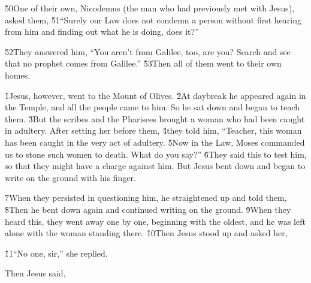 \v{50}One of their own, Nicodemus (the man who had previously met with Jesus), asked them, \v{51}``Surely our Law does not condemn a person without first hearing from him and finding out what he is doing, does it?''

\v{52}They answered him, ``You aren't from Galilee, too, are you? Search and see that no prophet comes from Galilee.'' \v{53}Then all of them went to their own homes.

\v{1}Jesus, however, went to the Mount of Olives. \v{2}At daybreak he appeared again in the Temple, and all the people came to him. So he sat down and began to teach them. \v{3}But the scribes and the Pharisees brought a woman who had been caught in adultery. After setting her before them, \v{4}they told him, ``Teacher, this woman has been caught in the very act of adultery. \v{5}Now in the Law, Moses commanded us to stone such women to death. What do you say?'' \v{6}They said this to test him, so that they might have a charge against him. But Jesus bent down and began to write on the ground with his finger.

\v{7}When they persisted in questioning him, he straightened up and told them,  \v{8}Then he bent down again and continued writing on the ground. \v{9}When they heard this, they went away one by one, beginning with the oldest, and he was left alone with the woman standing there. \v{10}Then Jesus stood up and asked her, 

\v{11}``No one, sir,'' she replied.

Then Jesus said, 

